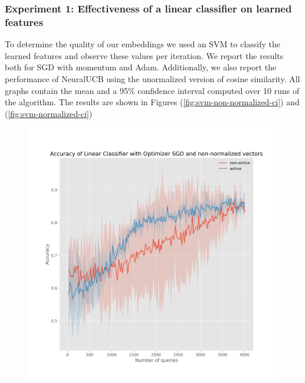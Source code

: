 \documentclass{article}
\begin{document}
\subsubsection{Experiment 1: Effectiveness of a linear classifier on learned features}
To determine the quality of our embeddings we used an SVM to classify the learned features and observe these values
per iteration. We report the results both for SGD with momentum and Adam. Additionally, we also report the performance of NeuralUCB
using the unormalized version of cosine similarity. All graphs contain the mean and a 95\% confidence interval
computed over 10 runs of the algorithm. The results are shown in Figures (\ref{fig:svm-non-normalized-ci}) and (\ref{fig:svm-normalized-ci})

\begin{figure}[t]
  \centering
  \begin{minipage}{.45\textwidth}
    \centering
    \includegraphics[width=\linewidth]{active-vs-base-moons-linear-loss-SGD-non-normalized-ci}
  \end{minipage}%
  \begin{minipage}{.45\textwidth}
    \centering

\end{minipage}
\end{figure}
\end{document}
